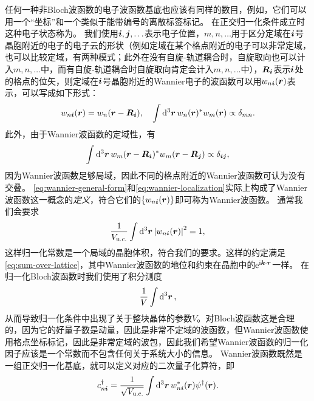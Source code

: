 任何一种非Bloch波函数的电子波函数基底也应该有同样的数目，例如，它们可以用一个“坐标”和一个类似于能带编号的离散标签标记。
在正交归一化条件成立时这种电子状态称为。
我们使用$\vb*{i}, \vb*{j}, \ldots$表示电子位置，$m, n, \ldots$用于区分定域在$\vb*{i}$号晶胞附近的电子的电子云的形状（例如定域在某个格点附近的电子可以非常定域，也可以比较定域，有两种模式；此外在没有自旋-轨道耦合时，自旋取向也可以计入$m, n, \ldots$中，而有自旋-轨道耦合时自旋取向肯定会计入$m, n, \ldots$中），$\vb*{R}_{\vb*{i}}$表示$\vb*{i}$处的格点的位矢，则定域在$\vb*{i}$号晶胞附近的Wannier电子的波函数可以用$w_{n\vb*{i}}(\vb*{r})$表示，可以写成如下形式：
\begin{equation}
    w_{n \vb*{i}}(\vb*{r}) = w_{n}(\vb*{r} - \vb*{R}_{\vb*{i}}), \quad \int \dd[3]{\vb*{r}} w_n(\vb*{r})^* w_m(\vb*{r}) \propto \delta_{mn}.
    \label{eq:wannier-general-form}
\end{equation}
此外，由于Wannier波函数的定域性，有
\begin{equation}
    \int \dd[3]{\vb*{r}} w_m(\vb*{r} - \vb*{R}_{\vb*{i}})^* w_m(\vb*{r} - \vb*{R}_{\vb*{j}}) \propto \delta_{\vb*{i} \vb*{j}},
    \label{eq:wannier-localization}
\end{equation}
因为Wannier波函数足够局域，因此不同的格点附近的Wannier波函数可认为没有交叠。
\eqref{eq:wannier-general-form}和\eqref{eq:wannier-localization}实际上构成了Wannier波函数这一概念的\emph{定义}，符合它们的$\{w_{n \vb*{i}}(\vb*{r})\}$即可称为Wannier波函数。
通常我们会要求
\begin{equation}
    \frac{1}{V_\text{u.c.}} \int \dd[3]{\vb*{r}} \abs{w_{n \vb*{i}}(\vb*{r})}^2 = 1,
    \label{eq:wannier-function-normalization-uc}
\end{equation}
这样归一化常数是一个局域的晶胞体积，符合我们的要求。这样的约定满足\eqref{eq:sum-over-lattice}，其中Wannier波函数的地位和约束在晶胞中的$\mathrm{e}^{\mathrm{i} \vb*{k} \cdot \vb*{r}}$一样。
在归一化Bloch波函数时我们使用了积分测度
\[
    \frac{1}{V} \int \dd[3]{\vb*{r}},
\]
从而导致归一化条件中出现了关于整块晶体的参数$V$。对Bloch波函数这是合理的，因为它的好量子数是动量，因此是非常不定域的波函数，但Wannier波函数使用格点坐标标记，因此是非常定域的波包，因此我们希望Wannier波函数的归一化因子应该是一个常数而不包含任何关于系统大小的信息。
Wannier波函数既然是一组正交归一化基底，就可以定义对应的二次量子化算符，即
\begin{equation}
    {c}^\dagger_{n \vb*{i}} = \frac{1}{\sqrt{V_\text{u.c.}}} \int \dd[3]{\vb*{r}} w_{n \vb*{i}}^*(\vb*{r}) {\psi}^\dagger(\vb*{r}).
    \label{eq:wannier-and-free}
\end{equation}

